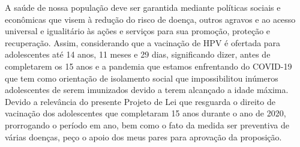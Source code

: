 \documentclass[10pt]{article}
\begin{document}
  A saúde de nossa população deve ser garantida mediante políticas sociais e econômicas que visem à redução do risco de doença, outros agravos e ao acesso universal e igualitário às ações e serviços para sua promoção, proteção e recuperação. Assim, considerando que a vacinação de HPV é ofertada para adolescentes até 14 anos, 11 meses e 29 dias, significando dizer, antes de completarem os 15 anos e a pandemia que estamos enfrentando do COVID-19 que tem como orientação de isolamento social que impossibilitou inúmeros adolescentes de serem imunizados devido a terem alcançado a idade máxima.
Devido a relevância do presente Projeto de Lei que resguarda o direito de vacinação dos adolescentes que completaram 15 anos durante o ano de 2020, prorrogando o período em ano, bem como o fato da medida ser preventiva de várias doenças, peço o apoio dos meus pares para aprovação da proposição.




\iffalse
\begin{center}
  \textbf{REFERÊNCIAS}
\end{center}


\fi
\end{document}
